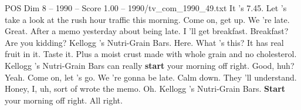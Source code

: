 \begin{textsample}{POS Dim 8 – 1990 – Score 1.00 – 1990/tv\_com\_1990\_49.txt}  \label{ex:f8_pos_078}
It 's 7.45.
Let 's take a look at the rush hour traffic this morning.
Come on, get up.
We 're late.
Great.
After a memo yesterday about being late.
I 'll get breakfast.
Breakfast?
Are you kidding?
Kellogg 's Nutri-Grain Bars.
Here.
What 's this?
It has real fruit in it.
Taste it.
Plus a moist crust made with whole grain and no cholesterol.
Kellogg 's Nutri-Grain Bars can really \textbf{start} your morning off right.
Good, huh?
Yeah.
Come on, let 's go.
We 're gonna be late.
Calm down.
They 'll understand.
Honey, I, uh, sort of wrote the memo.
Oh.
Kellogg 's Nutri-Grain Bars. \textbf{Start} your morning off right.
All right.

\end{textsample}
